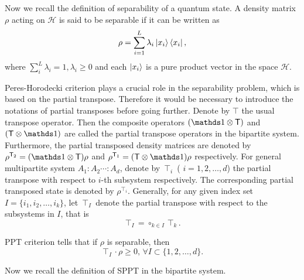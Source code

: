 Now we recall the definition of separability of a quantum state. A density matrix $\rho$ acting on  $\mathcal{H}$ is said to be
separable if it can be written as
\begin{equation}
  \label{eq:12}
  \rho = \sum_{i=1}^{L} \lambda_i\ket{x_i}\bra{x_i},
\end{equation}
where $\sum_{i}^{L}\lambda_i = 1,\lambda_i\geqslant 0$ and each $\ket{x_{i}}$ is a pure product vector in the space
$\mathcal{H}$.

Peres-Horodecki criterion plays a crucial role in the separability problem, which is based on the partial transpose.
Therefore it would be necessary to introduce the notations of partial transposes before going further.  Denote by $\intercal$ the usual transpose operator.  Then the composite
operators $(\I\otimes \intercal)$ and $(\intercal\otimes \I)$ are called the partial transpose operators in the
bipartite system. Furthermore,
the partial transposed density matrices are denoted by $ \rho^{\intercal_2}=(\I\otimes \intercal)\rho$ and
$\rho^{\intercal_1}=(\intercal\otimes \I)\rho $ respectively.  For general multipartite system $A_1:A_2\cdots:A_d$, denote by
$\intercal_i$ ( $i=1,2,\ldots,d$) the partial transpose with respect to $i$-th subsystem respectively. The corresponding
partial transposed state is denoted by $\rho^{\intercal_i}$. Generally, for any  given  index set $I = \{i_1,i_2,\ldots,i_k\}$,
let $\intercal_I$ denote the partial transpose with respect to the subsystems in $I$, that is
\[ \intercal_{I}= \circ_{k\in I}\intercal_k.\] 

PPT  criterion tells  that if $\rho$ is separable, then
\begin{equation}
  \label{multiSPPTv0.6:eq:1}
  \intercal_{\!I} \cdot \rho\geqslant 0,\,\forall I\subset \{1,2,\ldots,d\}.
\end{equation}

Now we recall the definition of SPPT in the bipartite system.



